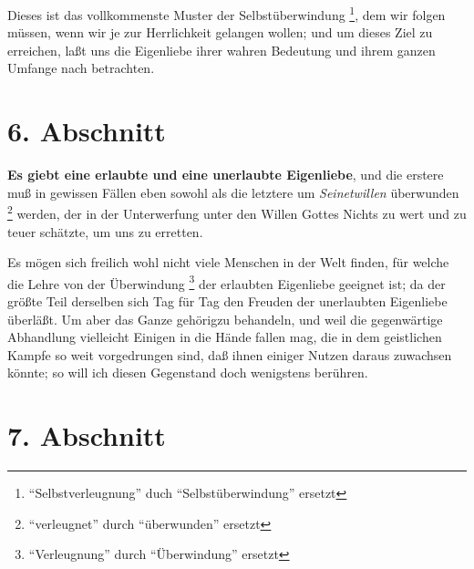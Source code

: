Dieses ist das vollkommenste Muster der Selbstüberwindung
\footnote{"`Selbstverleugnung"' duch "`Selbstüberwindung"' ersetzt}, dem wir
folgen
müssen, wenn wir je zur Herrlichkeit gelangen wollen; und um dieses Ziel zu
erreichen, laßt uns die Eigenliebe ihrer wahren Bedeutung und ihrem ganzen
Umfange nach betrachten.

\section{6. Abschnitt} \label{kap4_ab6}

\textbf{Es giebt eine erlaubte und eine unerlaubte Eigenliebe}, und die erstere
muß in
gewissen Fällen eben sowohl als die letztere um \textit{Seinetwillen} überwunden
\footnote{"`verleugnet"' durch "`überwunden"' ersetzt}
werden, der in der Unterwerfung unter den Willen Gottes Nichts zu wert und zu
teuer schätzte, um uns zu erretten.

Es mögen sich freilich wohl nicht viele Menschen in der Welt finden, für welche
die Lehre von der Überwindung \footnote{"`Verleugnung"' durch "`Überwindung"'
ersetzt} der erlaubten Eigenliebe geeignet ist; da der
größte Teil derselben sich Tag für Tag den Freuden der unerlaubten
Eigenliebe überläßt. Um aber das Ganze gehörigzu behandeln, und weil die
gegenwärtige Abhandlung vielleicht Einigen in die Hände fallen mag, die in dem
geistlichen Kampfe so weit vorgedrungen sind, daß ihnen einiger Nutzen daraus
zuwachsen könnte; so will ich diesen Gegenstand doch wenigstens berühren.

\section{7. Abschnitt} \label{kap4_ab7}

